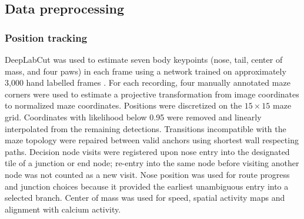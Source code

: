 \documentclass[fleqn,10pt]{wlscirep}
\begin{document}

\subsection*{Data preprocessing}

\subsubsection*{Position tracking}

DeepLabCut was used to estimate seven body keypoints (nose, tail, center of mass, and four paws) in each frame using a network trained on approximately 3,000 hand labelled frames \cite{mathis_deeplabcut_2018}. For each recording, four manually annotated maze corners were used to estimate a projective transformation from image coordinates to normalized maze coordinates. Positions were discretized on the $15 \times 15$ maze grid. Coordinates with likelihood below 0.95 were removed and linearly interpolated from the remaining detections. Transitions incompatible with the maze topology were repaired between valid anchors using shortest wall respecting paths. Decision node visits were registered upon nose entry into the designated tile of a junction or end node; re-entry into the same node before visiting another node was not counted as a new visit. Nose position was used for route progress and junction choices because it provided the earliest unambiguous entry into a selected branch. Center of mass was used for speed, spatial activity maps and alignment with calcium activity. 
\end{document}
